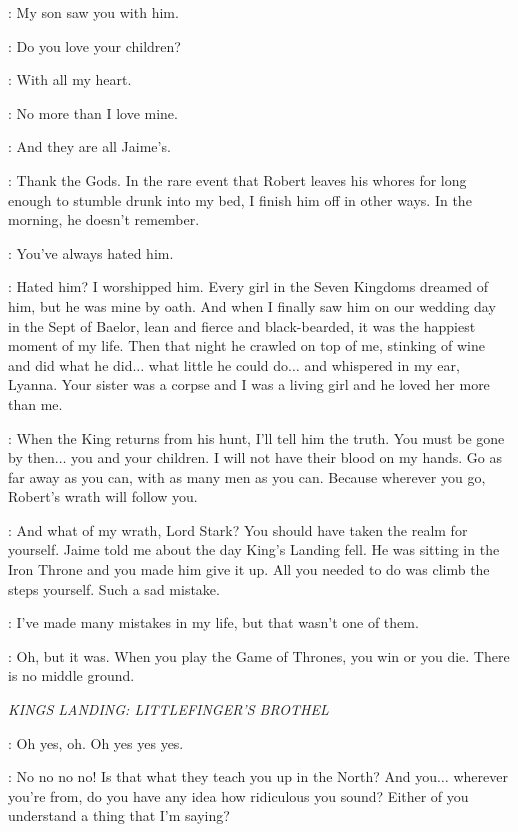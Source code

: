 \NED: My son saw you with him. 

\CERSEI: Do you love your children? 

\NED: With all my heart. 

\CERSEI: No more than I love mine. 

\NED: And they are all Jaime's. 

\CERSEI: Thank the Gods. In the rare event that Robert leaves his whores for long enough to stumble drunk into my bed, I finish him off in other ways. In the morning, he doesn't remember. 

\NED: You've always hated him. 

\CERSEI: Hated him? I worshipped him. Every girl in the Seven Kingdoms dreamed of him, but he was mine by oath. And when I finally saw him on our wedding day in the Sept of Baelor, lean and fierce and black-bearded, it was the happiest moment of my life. Then that night he crawled on top of me, stinking of wine and did what he did$\ldots$ what little he could do$\ldots$ and whispered in my ear, Lyanna. Your sister was a corpse and I was a living girl and he loved her more than me. 

\NED: When the King returns from his hunt, I'll tell him the truth. You must be gone by then$\ldots$ you and your children. I will not have their blood on my hands. Go as far away as you can, with as many men as you can. Because wherever you go, Robert's wrath will follow you. 

\CERSEI: And what of my wrath, Lord Stark? You should have taken the realm for yourself. Jaime told me about the day King's Landing fell. He was sitting in the Iron Throne and you made him give it up. All you needed to do was climb the steps yourself. Such a sad mistake. 

\NED: I've made many mistakes in my life, but that wasn't one of them. 

\CERSEI: Oh, but it was. When you play the Game of Thrones, you win or you die. There is no middle ground. 


\scene

\textit{KINGS LANDING: LITTLEFINGER'S BROTHEL} 


\ROS: Oh yes, oh. Oh yes yes yes. 

\LITTLEFINGER: No no no no! Is that what they teach you up in the North? And you$\ldots$ wherever you're from, do you have any idea how ridiculous you sound? Either of you understand a thing that I'm saying? 


